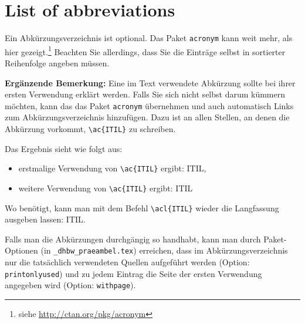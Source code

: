 \chapter*{List of abbreviations}

Ein Abkürzungsverzeichnis ist optional. Das Paket \verb|acronym| kann weit mehr, als hier gezeigt.\footnote{siehe \url{http://ctan.org/pkg/acronym}}
Beachten Sie allerdings, dass Sie die Einträge selbst in sortierter Reihenfolge angeben müssen.

\begin{acronym}[MCMC] 


\end{acronym}

\vspace{2em}
{\footnotesize
\textbf{Ergänzende Bemerkung:}
Eine im Text verwendete Abkürzung sollte bei ihrer ersten Verwendung erklärt werden. Falls Sie sich nicht selbst darum kümmern möchten, kann das das Paket \verb|acronym| übernehmen und auch automatisch Links zum Abkürzungsverzeichnis hinzufügen. Dazu ist an allen Stellen, an denen die Abkürzung vorkommt, \verb|\ac{ITIL}| zu schreiben. 

Das Ergebnis sieht wie folgt aus: 
\begin{itemize}
\item erstmalige Verwendung von \verb|\ac{ITIL}| ergibt: \ac{ITIL},
\item weitere Verwendung von \verb|\ac{ITIL}| ergibt: \ac{ITIL}
\end{itemize}
Wo benötigt, kann man mit dem Befehl \verb|\acl{ITIL}| wieder die Langfassung ausgeben lassen: \acl{ITIL}.

Falls man die Abkürzungen durchgängig so handhabt, kann man durch Paket-Optionen (in \verb|_dhbw_praeambel.tex|)
erreichen, dass im Abkürzungsverzeichnis nur die tatsächlich verwendeten Quellen aufgeführt werden (Option: \verb|printonlyused|) und zu jedem Eintrag die Seite der ersten Verwendung angegeben wird (Option: \verb|withpage|).
}
